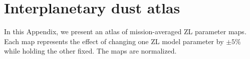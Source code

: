 \documentclass[twocolumn]{aa}
\begin{document}
%


% 


\appendix
\onecolumn

\section{Interplanetary dust atlas}
\label{sec:param-atlas}
In this Appendix, we present an atlas of mission-averaged ZL parameter maps.
Each map represents the effect of changing one ZL model parameter by $\pm 5\%$ while holding the other fixed. The maps are normalized.
\end{document}
